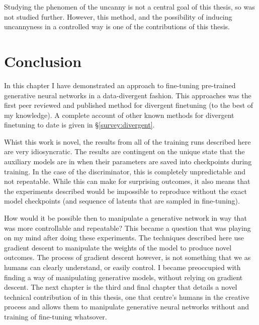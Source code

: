 Studying the phenomen of the uncanny is not a central goal of this thesis, so was not studied further.
However, this method, and the possibility of inducing uncannyness in a controlled way is one of the contributions of this thesis. 

\section{Conclusion}

In this chapter I have demonstrated an approach to fine-tuning pre-trained generative neural networks in a data-divergent fashion.
This approaches was the first peer reviewed and published method for divergent finetuning (to the best of my knowledge).
A complete account of other known methods for divergent finetuning to date is given in \S \ref{survey:divergent}.

Whist this work is novel, the results from all of the training runs described here are very idiosyncratic. 
The results are contingent on the unique state that the auxiliary models are in when their parameters are saved into checkpoints during training. 
In the case of the discriminator, this is completely unpredictable and not repeatable. 
While this can make for surprising outcomes, it also means that the experiments described would be impossible to reproduce without the exact model checkpoints (and sequence of latents that are sampled in fine-tuning).

How would it be possible then to manipulate a generative network in way that was more controllable and repeatable?
This became a question that was playing on my mind after doing these experiments. 
The techniques described here use gradient descent to manipulate the weights of the model to produce novel outcomes. 
The process of gradient descent however, is not something that we as humans can clearly understand, or easily control.
I became preoccupied with finding a way of manipulating generative models, without relying on gradient descent. 
The next chapter is the third and final chapter that details a novel technical contribution of in this thesis, one that centre's humans in the creative process and allows them to manipulate generative neural networks without and training of fine-tuning whatsover.
